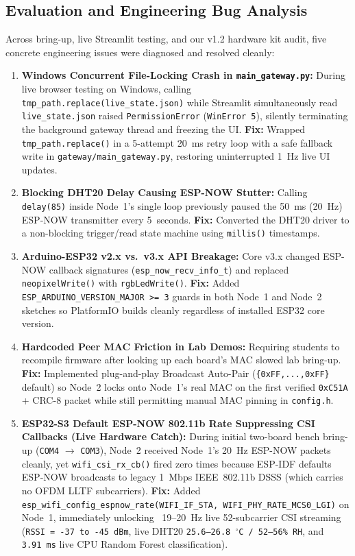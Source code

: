 \documentclass{hcmut-report}
\begin{document}
\subsection{Evaluation and Engineering Bug Analysis}
Across bring-up, live Streamlit testing, and our v1.2 hardware kit audit, five concrete engineering issues were diagnosed and resolved cleanly:
\begin{enumerate}
  \item \textbf{Windows Concurrent File-Locking Crash in \texttt{main\_gateway.py}:} During live browser testing on Windows, calling \texttt{tmp\_path.replace(live\_state.json)} while Streamlit simultaneously read \texttt{live\_state.json} raised \texttt{PermissionError} (\texttt{WinError~5}), silently terminating the background gateway thread and freezing the UI. \textbf{Fix:} Wrapped \texttt{tmp\_path.replace()} in a 5-attempt 20~ms retry loop with a safe fallback write in \texttt{gateway/main\_gateway.py}, restoring uninterrupted 1~Hz live UI updates.
  \item \textbf{Blocking DHT20 Delay Causing ESP-NOW Stutter:} Calling \texttt{delay(85)} inside Node~1's single loop previously paused the 50~ms (20~Hz) ESP-NOW transmitter every 5~seconds. \textbf{Fix:} Converted the DHT20 driver to a non-blocking trigger/read state machine using \texttt{millis()} timestamps.
  \item \textbf{Arduino-ESP32 v2.x vs.\ v3.x API Breakage:} Core v3.x changed ESP-NOW callback signatures (\texttt{esp\_now\_recv\_info\_t}) and replaced \texttt{neopixelWrite()} with \texttt{rgbLedWrite()}. \textbf{Fix:} Added \texttt{ESP\_ARDUINO\_VERSION\_MAJOR >= 3} guards in both Node~1 and Node~2 sketches so PlatformIO builds cleanly regardless of installed ESP32 core version.
  \item \textbf{Hardcoded Peer MAC Friction in Lab Demos:} Requiring students to recompile firmware after looking up each board's MAC slowed lab bring-up. \textbf{Fix:} Implemented plug-and-play Broadcast Auto-Pair (\texttt{\{0xFF,...,0xFF\}} default) so Node~2 locks onto Node~1's real MAC on the first verified \texttt{0xC51A} + CRC-8 packet while still permitting manual MAC pinning in \texttt{config.h}.
  \item \textbf{ESP32-S3 Default ESP-NOW 802.11b Rate Suppressing CSI Callbacks (Live Hardware Catch):} During initial two-board bench bring-up (\texttt{COM4} $\rightarrow$ \texttt{COM3}), Node~2 received Node~1's 20~Hz ESP-NOW packets cleanly, yet \texttt{wifi\_csi\_rx\_cb()} fired zero times because ESP-IDF defaults ESP-NOW broadcasts to legacy 1~Mbps IEEE~802.11b DSSS (which carries no OFDM LLTF subcarriers). \textbf{Fix:} Added \texttt{esp\_wifi\_config\_espnow\_rate(WIFI\_IF\_STA, WIFI\_PHY\_RATE\_MCS0\_LGI)} on Node~1, immediately unlocking ~19--20~Hz live 52-subcarrier CSI streaming (\texttt{RSSI = -37 to -45~dBm}, live DHT20 \texttt{25.6--26.8~$^\circ$C / 52--56\%~RH}, and \texttt{3.91~ms} live CPU Random Forest classification).

\end{enumerate}
\end{document}
